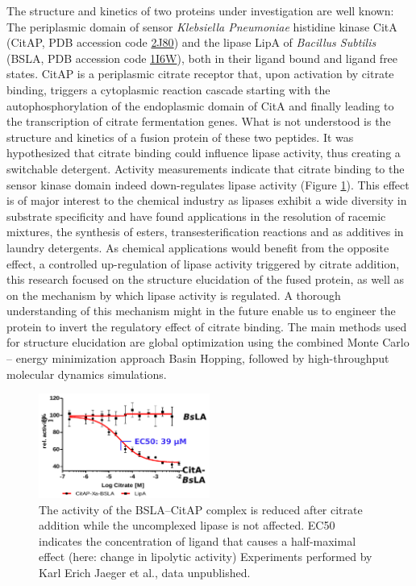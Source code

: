 \documentclass[english, a4paper, 12pt, titlepage, draft]{article}
\newcommand{\PDB}[1]{\href{http://pdb.rcsb.org/pdb/explore/explore.do?structureId=#1}{#1}}
\begin{document}
The structure and kinetics of two proteins under investigation are well known:
The periplasmic domain of sensor \textit{Klebsiella Pneumoniae} histidine kinase CitA (CitAP, PDB accession code \PDB{2J80}) \cite{CitA_2J80}
and the lipase LipA of \textit{Bacillus Subtilis} (BSLA, PDB accession code \PDB{1I6W}), \cite{BSLA_1I6W} both in their ligand bound and ligand free states.
CitAP is a periplasmic citrate receptor that, upon activation by citrate binding, triggers a cytoplasmic reaction cascade starting with the autophosphorylation of the endoplasmic domain of CitA and finally leading to the transcription of citrate fermentation genes.
What is not understood is the structure and kinetics of a fusion protein of these two peptides.
It was hypothesized that citrate binding could influence lipase activity, thus creating a switchable detergent.
Activity measurements indicate that citrate binding to the sensor kinase domain indeed down-regulates lipase activity (Figure \ref{fig:BSLAactivity}).
This effect is of major interest to the chemical industry as lipases exhibit a wide diversity in substrate specificity and have found applications in the resolution of racemic mixtures, the synthesis of esters, transesterification reactions and as additives in laundry detergents.
As chemical applications would benefit from the opposite effect, a controlled up-regulation of lipase activity triggered by citrate addition, this research focused on the structure elucidation of the fused protein, as well as on the mechanism by which lipase activity is regulated.
A thorough understanding of this mechanism might in the future enable us to engineer the protein to invert the regulatory effect of citrate binding.
The main methods used for structure elucidation are global optimization using the combined Monte Carlo -- energy minimization approach Basin Hopping, followed by high-throughput molecular dynamics simulations. 
 

\begin{figure}
    \centering
    \includegraphics[width=0.5\textwidth]{figures/BSLA_activity/BSLA_activity.png}
    \caption{The activity of the BSLA--CitAP complex is reduced after citrate addition while the uncomplexed lipase is not affected.
    EC50 indicates the concentration of ligand that causes a half-maximal effect (here: change in lipolytic activity)
    Experiments performed by Karl Erich Jaeger et al., data unpublished.}   
    \label{fig:BSLAactivity}
\end{figure}
\end{document}
